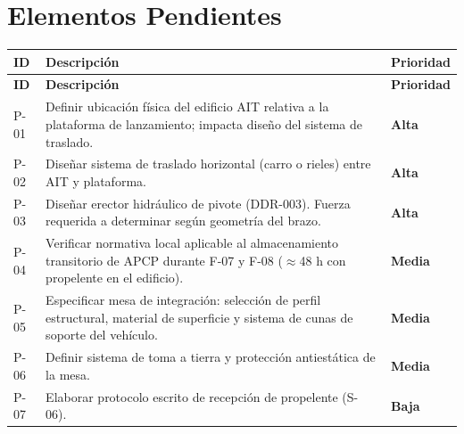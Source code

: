 \documentclass[11pt, a4paper]{article}
\begin{document}
\section{Elementos Pendientes}

\begin{longtable}{C{1cm} L{8cm} C{2.2cm}}
  \color{white}\textbf{ID} &
  \color{white}\textbf{Descripción} &
  \color{white}\textbf{Prioridad} \\
  \endfirsthead
  \color{white}\textbf{ID} &
  \color{white}\textbf{Descripción} &
  \color{white}\textbf{Prioridad} \\
  \endhead
  P-01 & Definir ubicación física del edificio AIT relativa a la plataforma de lanzamiento; impacta diseño del sistema de traslado. & \textcolor{tlvred}{\textbf{Alta}} \\
  P-02 & Diseñar sistema de traslado horizontal (carro o rieles) entre AIT y plataforma. & \textcolor{tlvred}{\textbf{Alta}} \\
  P-03 & Diseñar erector hidráulico de pivote (DDR-003). Fuerza requerida a determinar según geometría del brazo. & \textcolor{tlvred}{\textbf{Alta}} \\
  P-04 & Verificar normativa local aplicable al almacenamiento transitorio de APCP durante F-07 y F-08 ($\approx$48 h con propelente en el edificio). & \textcolor{tlvorange}{\textbf{Media}} \\
  P-05 & Especificar mesa de integración: selección de perfil estructural, material de superficie y sistema de cunas de soporte del vehículo. & \textcolor{tlvorange}{\textbf{Media}} \\
  P-06 & Definir sistema de toma a tierra y protección antiestática de la mesa. & \textcolor{tlvorange}{\textbf{Media}} \\
  P-07 & Elaborar protocolo escrito de recepción de propelente (S-06). & \textbf{Baja} \\
\end{longtable}
\end{document}
